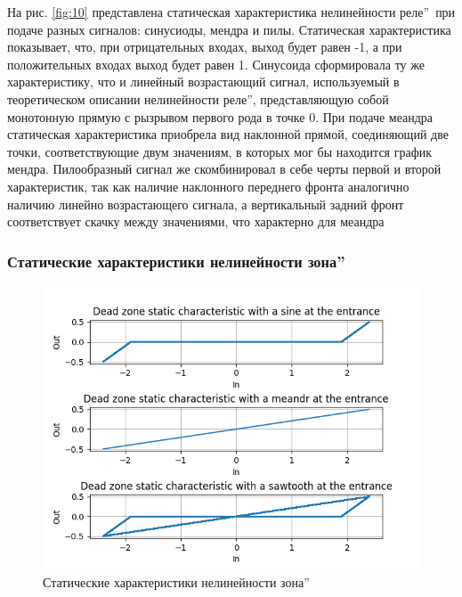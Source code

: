 На рис. \ref{fig:10} представлена статическая характеристика
нелинейности  реле\textquotedblright\ 
при подаче разных сигналов: синусиоды, мендра и пилы.
Статическая характеристика показывает, что, при отрицательных
входах, выход будет равен -1, а при положительных входах выход
будет равен 1. Синусоида сформировала ту же характеристику, что
и линейный возрастающий сигнал, используемый в теоретическом
описании нелинейности  реле\textquotedblright, представляющую собой
монотонную прямую с рызрывом первого рода в точке 0. При подаче
меандра статическая характеристика приобрела вид наклонной прямой,
соединяющий две точки, соответствующие двум значениям, в которых
мог бы находится график мендра. Пилообразный сигнал же скомбинировал
в себе черты первой и второй характеристик, так как наличие
наклонного переднего фронта аналогично наличию линейно
возрастающего сигнала, а вертикальный задний фронт соответствует
скачку между значениями, что характерно для меандра

\subsubsection{Статические характеристики нелинейности  зона\textquotedblright}

\begin{figure}[H]
	\centering
	\includegraphics[width=0.7\linewidth]{body/images/dead-zone-static-characteristics.png}
	\caption{Статические характеристики нелинейности \textquotedblleftМёртвая зона\textquotedblright}
	\label{fig:11}
\end{figure}

